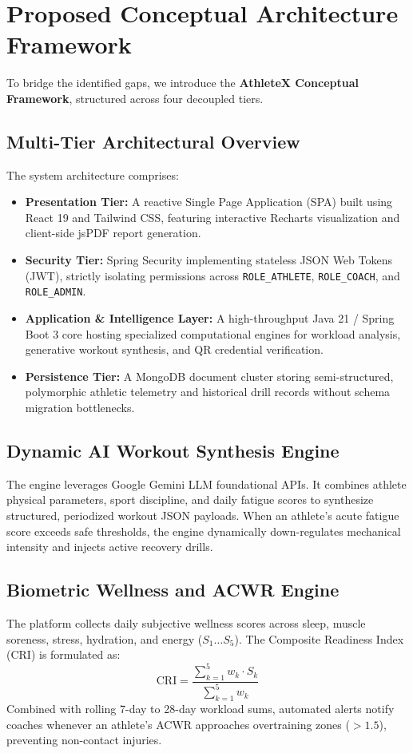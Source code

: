 \documentclass[conference]{IEEEtran}
\begin{document}
\section{Proposed Conceptual Architecture Framework}
To bridge the identified gaps, we introduce the \textbf{AthleteX Conceptual Framework}, structured across four decoupled tiers.

\subsection{Multi-Tier Architectural Overview}
The system architecture comprises:
\begin{itemize}
    \item \textbf{Presentation Tier:} A reactive Single Page Application (SPA) built using React 19 and Tailwind CSS, featuring interactive Recharts visualization and client-side jsPDF report generation.
    \item \textbf{Security Tier:} Spring Security implementing stateless JSON Web Tokens (JWT), strictly isolating permissions across \texttt{ROLE\_ATHLETE}, \texttt{ROLE\_COACH}, and \texttt{ROLE\_ADMIN}.
    \item \textbf{Application \& Intelligence Layer:} A high-throughput Java 21 / Spring Boot 3 core hosting specialized computational engines for workload analysis, generative workout synthesis, and QR credential verification.
    \item \textbf{Persistence Tier:} A MongoDB document cluster storing semi-structured, polymorphic athletic telemetry and historical drill records without schema migration bottlenecks.
\end{itemize}

\subsection{Dynamic AI Workout Synthesis Engine}
The engine leverages Google Gemini LLM foundational APIs. It combines athlete physical parameters, sport discipline, and daily fatigue scores to synthesize structured, periodized workout JSON payloads. When an athlete's acute fatigue score exceeds safe thresholds, the engine dynamically down-regulates mechanical intensity and injects active recovery drills.

\subsection{Biometric Wellness and ACWR Engine}
The platform collects daily subjective wellness scores across sleep, muscle soreness, stress, hydration, and energy ($S_1 \dots S_5$). The Composite Readiness Index (CRI) is formulated as:
\begin{equation}
\text{CRI} = \frac{\sum_{k=1}^{5} w_k \cdot S_k}{\sum_{k=1}^{5} w_k}
\end{equation}
Combined with rolling 7-day to 28-day workload sums, automated alerts notify coaches whenever an athlete's ACWR approaches overtraining zones ($>1.5$), preventing non-contact injuries.
\end{document}
